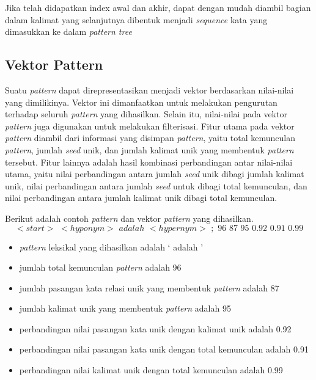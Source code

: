 \noindent Jika telah didapatkan index awal dan akhir, dapat dengan mudah diambil bagian dalam kalimat yang selanjutnya dibentuk menjadi \textit{sequence} kata yang dimasukkan ke dalam \textit{pattern tree}

\subsection{Vektor Pattern}
Suatu \textit{pattern} dapat direpresentasikan menjadi vektor berdasarkan nilai-nilai yang dimilikinya. Vektor ini dimanfaatkan untuk melakukan pengurutan terhadap seluruh \textit{pattern} yang dihasilkan. Selain itu, nilai-nilai pada vektor \textit{pattern} juga digunakan untuk melakukan filterisasi. Fitur utama pada vektor \textit{pattern} diambil dari informasi yang disimpan \textit{pattern}, yaitu total kemunculan \textit{pattern}, jumlah \textit{seed} unik, dan jumlah kalimat unik yang membentuk \textit{pattern} tersebut. Fitur lainnya adalah hasil kombinasi perbandingan antar nilai-nilai utama, yaitu nilai perbandingan antara jumlah \textit{seed} unik dibagi jumlah kalimat unik, nilai perbandingan antara jumlah \textit{seed} untuk dibagi total kemunculan, dan nilai perbandingan antara jumlah kalimat unik dibagi total kemunculan.

Berikut adalah contoh \textit{pattern} dan vektor \textit{pattern} yang dihasilkan.
\begin{equation}
<start>\,\,<hyponym>\,\,adalah\,\,<hypernym>\,\,;\,\,96\,\,87\,\,95\,\,0.92\,\,0.91\,\,0.99
\end{equation}
\begin{itemize}
  \item \textit{pattern} leksikal yang dihasilkan adalah `{\tagStart} {\tagHyponym} adalah {\tagHypernym}'
  \item jumlah total kemunculan \textit{pattern} adalah 96
  \item jumlah pasangan kata relasi unik yang membentuk \textit{pattern} adalah 87
  \item jumlah kalimat unik yang membentuk \textit{pattern} adalah 95
  \item perbandingan nilai pasangan kata unik dengan kalimat unik adalah 0.92
  \item perbandingan nilai pasangan kata unik dengan total kemunculan adalah 0.91
  \item perbandingan nilai kalimat unik dengan total kemunculan adalah 0.99
\end{itemize}

